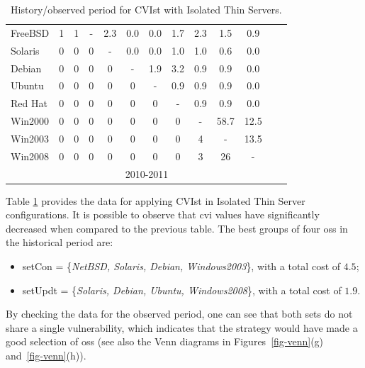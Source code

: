 \begin{table}[!ht]
\begin{center}
{\begin{tabular}{|l|c|c|c|c|c|c|c|c|c|c|c|c|}
FreeBSD & 1 & 1 & - & 2.3 & 0.0 & 0.0 & 1.7 & 2.3 & 1.5 & 0.9&\\ \cline{1-11}
Solaris & 0 & 0 & 0 & - & 0.0 & 0.0 & 1.0 & 1.0 & 0.6 & 0.0&\\ \cline{1-11}
Debian & 0 & 0 & 0 & 0 & - & 1.9 & 3.2 & 0.9 & 0.9 & 0.0&\\ \cline{1-11}
Ubuntu & 0 & 0 & 0 & 0 & 0 &  - & 0.9 & 0.9 & 0.9 & 0.0&\\ \cline{1-11}
Red Hat & 0 & 0 & 0 & 0 & 0 & 0 &- & 0.9 & 0.9 & 0.0&\\ \cline{1-11}
Win2000 & 0 & 0 & 0 & 0 & 0 & 0 & 0 & - & 58.7 & 12.5&\\ \cline{1-11}
Win2003 & 0 & 0 & 0 & 0 & 0 & 0 & 0 & 4 & - & 13.5&\\ \cline{1-12}
Win2008 & 0 & 0 & 0 & 0 & 0 & 0 & 0 & 3 & 26 & -&\multicolumn{1}{|c}{}  \\ \cline{1-11}
 \multicolumn{1}{c|}{}& \multicolumn{9}{|c|}{2010-2011} & \multicolumn{2}{|c}{}\\ \cline{2-10}
\end{tabular}
\caption{History/observed period for CVIst with Isolated Thin Servers.}
\label{tab:strat_ii_iso}
}
\end{center}
\end{table}




Table \ref{tab:strat_ii_iso} provides the data for applying CVIst in Isolated Thin Server configurations. 
It is possible to observe that \gls{cvi} values have significantly decreased when compared to the previous table. 
The best groups of four \glspl{os} in the historical period are:
 
\begin{itemize}
\item setCon = \{\emph{NetBSD, Solaris, Debian, Windows2003}\}, with a total cost of $4.5$;
\item setUpdt = \{\emph{Solaris, Debian, Ubuntu, Windows2008}\}, with a total cost of $1.9$.
\end{itemize}

By checking the data for the observed period, one can see that both sets do not share a single vulnerability, which indicates that the strategy would have made a good selection of \glspl{os} (see also the Venn diagrams in Figures~\ref{fig-venn}(g) and~\ref{fig-venn}(h)).


